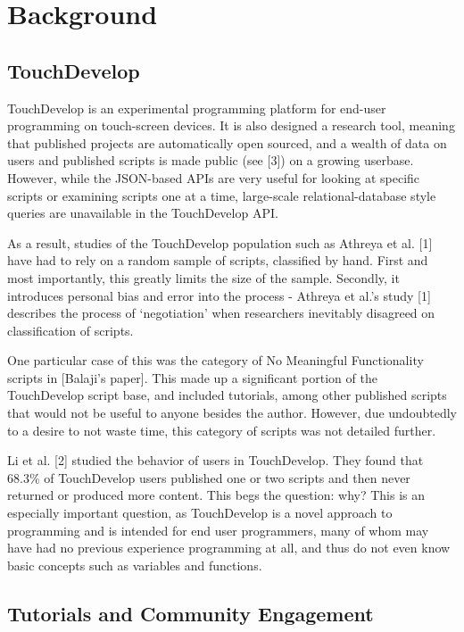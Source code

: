 \section{Background}

\subsection{TouchDevelop}

TouchDevelop is an experimental programming platform for end-user programming on touch-screen devices. It is also designed a research tool, meaning that published projects are automatically open sourced, and a wealth of data on users and published scripts is made public (see [3]) on a growing userbase. However, while the JSON-based APIs are very useful for looking at specific scripts or examining scripts one at a time, large-scale relational-database style queries are unavailable in the TouchDevelop API.

As a result, studies of the TouchDevelop population such as Athreya et al. [1] have had to rely on a random sample of scripts, classified by hand. First and most importantly, this greatly limits the size of the sample. Secondly, it introduces personal bias and error into the process - Athreya et al.’s study [1] describes the process of ‘negotiation’ when researchers inevitably disagreed on classification of scripts.

One particular case of this was the category of No Meaningful Functionality scripts in [Balaji’s paper]. This made up a significant portion of the TouchDevelop script base, and included tutorials, among other published scripts that would not be useful to anyone besides the author. However, due undoubtedly to a desire to not waste time, this category of scripts was not detailed further.

Li et al. [2] studied the behavior of users in TouchDevelop. They found that 68.3\% of TouchDevelop users published one or two scripts and then never returned or produced more content. This begs the question: why? This is an especially important question, as TouchDevelop is a novel approach to programming and is intended for end user programmers, many of whom may have had no previous experience programming at all, and thus do not even know basic concepts such as variables and functions.

\subsection{Tutorials and Community Engagement}

